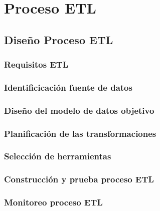 \documentclass[letterpaper, 12pt]{report}
\begin{document}
\chapter{Proceso ETL}


\section{Diseño Proceso ETL}


\subsection{Requisitos ETL}


\subsection{Identificicación fuente de datos}


\subsection{Diseño del modelo de datos objetivo}


\subsection{Planificación de las transformaciones}


\subsection{Selección de herramientas}


\subsection{Construcción y prueba proceso ETL}


\subsection{Monitoreo proceso ETL}

\end{document}
